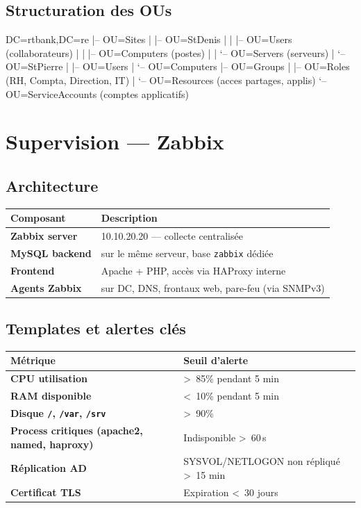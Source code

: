 \documentclass[11pt,a4paper]{article}
\begin{document}
\subsection{Structuration des OUs}

\begin{cfgbox}[listing options={style=cfg,language=bash}]
DC=rtbank,DC=re
|-- OU=Sites
|   |-- OU=StDenis
|   |   |-- OU=Users      (collaborateurs)
|   |   |-- OU=Computers  (postes)
|   |   `-- OU=Servers    (serveurs)
|   `-- OU=StPierre
|       |-- OU=Users
|       `-- OU=Computers
|-- OU=Groups
|   |-- OU=Roles       (RH, Compta, Direction, IT)
|   `-- OU=Resources   (acces partages, applis)
`-- OU=ServiceAccounts (comptes applicatifs)
\end{cfgbox}

\section{Supervision — Zabbix}

\subsection{Architecture}

\begin{tabularx}{\linewidth}{@{}>{\bfseries}l X@{}}
\toprule
\rowcolor{light} Composant & Description \\ \midrule
Zabbix server    & 10.10.20.20 — collecte centralisée \\
MySQL backend    & sur le même serveur, base \texttt{zabbix} dédiée \\
Frontend         & Apache + PHP, accès via HAProxy interne \\
Agents Zabbix    & sur DC, DNS, frontaux web, pare-feu (via SNMPv3) \\
\bottomrule
\end{tabularx}

\subsection{Templates et alertes clés}

\begin{tabularx}{\linewidth}{@{}>{\bfseries}p{4cm} X@{}}
\toprule
\rowcolor{light} Métrique & Seuil d'alerte \\ \midrule
CPU utilisation  & \textgreater{}~85\% pendant 5 min \\
RAM disponible   & \textless{}~10\% pendant 5 min \\
Disque \texttt{/}, \texttt{/var}, \texttt{/srv} & \textgreater{}~90\% \\
Process critiques (apache2, named, haproxy) & Indisponible \textgreater{}~60\,s \\
Réplication AD   & SYSVOL/NETLOGON non répliqué \textgreater{}~15 min \\
Certificat TLS   & Expiration \textless{}~30 jours \\
\bottomrule
\end{tabularx}
\end{document}
